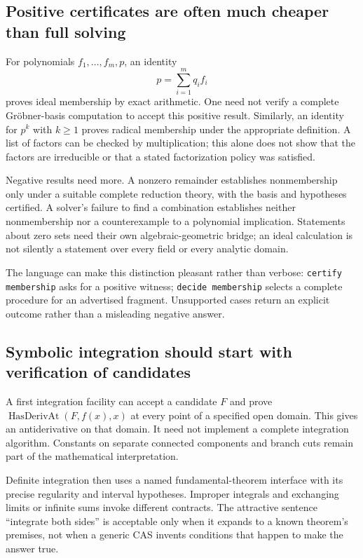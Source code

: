 \documentclass[11pt,letterpaper]{article}
\newcommand{\code}[1]{\nolinkurl{#1}}
\theoremstyle{definition}
\theoremstyle{remark}
\begin{document}
\subsection{Positive certificates are often much cheaper than full solving}
For polynomials $f_1,\ldots,f_m,p$, an identity
\[
 p=\sum_{i=1}^{m}q_i f_i
\]
proves ideal membership by exact arithmetic. One need not verify a complete
Gr\"obner-basis computation to accept this positive result. Similarly, an
identity for $p^k$ with $k\geq1$ proves radical membership under the appropriate
definition. A list of factors can be checked by multiplication; this alone
does not show that the factors are irreducible or that a stated factorization
policy was satisfied.

Negative results need more. A nonzero remainder establishes nonmembership only
under a suitable complete reduction theory, with the basis and hypotheses
certified. A solver's failure to find a combination establishes neither
nonmembership nor a counterexample to a polynomial implication. Statements
about zero sets need their own algebraic-geometric bridge; an ideal calculation
is not silently a statement over every field or every analytic domain.

The language can make this distinction pleasant rather than verbose:
\code{certify membership} asks for a positive witness; \code{decide membership}
selects a complete procedure for an advertised fragment. Unsupported cases
return an explicit outcome rather than a misleading negative answer.

\subsection{Symbolic integration should start with verification of candidates}
A first integration facility can accept a candidate $F$ and prove
$\operatorname{HasDerivAt}(F,f(x),x)$ at every point of a specified open domain.
This gives an antiderivative on that domain. It need not implement a complete
integration algorithm. Constants on separate connected components and branch
cuts remain part of the mathematical interpretation.

Definite integration then uses a named fundamental-theorem interface with its
precise regularity and interval hypotheses. Improper integrals and exchanging
limits or infinite sums invoke different contracts. The attractive sentence
``integrate both sides'' is acceptable only when it expands to a known theorem's
premises, not when a generic CAS invents conditions that happen to make the
answer true.
\end{document}
